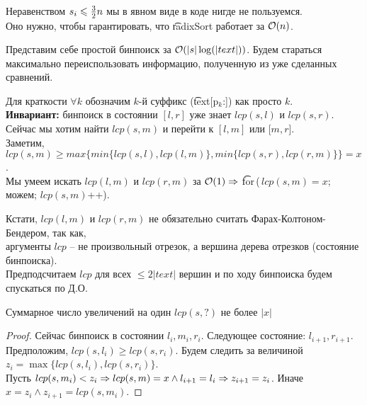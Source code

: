 \down
Неравенством $s_i \leqslant {\textstyle\frac{3}{2}}n$ мы в явном виде в коде нигде не пользуемся. \\
Оно нужно, чтобы гарантировать, что \t{radixSort} работает за $\mathcal{O}(n)$.

\label{sec@sufarraysearch}

Представим себе простой бинпоиск за $\mathcal{O}(|s| \log(|text|))$.
Будем стараться максимально переиспользовать информацию, полученную из уже сделанных сравнений.

\down
Для краткости $\forall k$ обозначим $k$-й суффикс (\t{text[p$_k$:]}) как просто $k$.\\
{\bf Инвариант:} бинпоиск в состоянии $[l, r]$ уже знает $lcp(s, l)$ и $lcp(s, r)$.\\
Сейчас мы хотим найти $lcp(s, m)$ и перейти к $[l, m]$ или $[m, r$].\\
Заметим, $lcp(s, m) \geq max\{min\{lcp(s, l), lcp(l, m)\}, min\{lcp(s, r), lcp(r, m)\}\} = x$.\\
Мы умеем искать $lcp(l, m)$ и $lcp(r, m)$ за $\mathcal{O}(1) \Rightarrow$
\t{for\,($\,lcp(s, m) = x$; можем; $lcp(s,m)$++)}.

\down
Кстати, $lcp(l, m)$ и $lcp(r, m)$ не обязательно считать Фарах-Колтоном-Бендером, так как, \\
аргументы $lcp$ -- не произвольный отрезок, а вершина дерева отрезков (состояние бинпоиска).\\
Предподсчитаем $lcp$ для всех $\le 2|text|$ вершин и по ходу бинпоиска будем спускаться по Д.О.

\begin{Thm}Суммарное число увеличений на один $lcp(s, ?)$ не более $|x|$\end{Thm}
\begin{proof}
Сейчас бинпоиск в состоянии $l_i, m_i, r_i$. Следующее состояние: $l_{i+1}, r_{i+1}$.\\
Предположим, $lcp(s, l_i) \ge lcp(s, r_i)$.
Будем следить за величиной $z_i = \max\{lcp(s, l_i), lcp(s, r_i)\}$.\\
Пусть $lcp(s, m_i) < z_i \Rightarrow lcp(s, m) = x \wedge l_{i+1} = l_i \Rightarrow z_{i+1} = z_i$.
Иначе $x = z_i \wedge z_{i+1} = lcp(s,m_i)$.
\end{proof}
